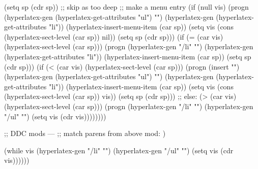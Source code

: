 \begin{ifhtml}
{              (setq sp (cdr sp)) ;; skip as too deep                     
              ;; make a menu entry
              (if (null vis)
                  (progn
                    (hyperlatex-gen (hyperlatex-get-attributes "ul") "\n")
                    (hyperlatex-gen (hyperlatex-get-attributes "li"))
                    (hyperlatex-insert-menu-item (car sp))
                    (setq vis (cons (hyperlatex-sect-level (car sp)) nil))
                    (setq sp (cdr sp)))
                  (if (= (car vis) (hyperlatex-sect-level (car sp)))
                      (progn
                        (hyperlatex-gen "/li" "\n")
                        (hyperlatex-gen (hyperlatex-get-attributes "li"))
                        (hyperlatex-insert-menu-item (car sp))
                        (setq sp (cdr sp)))
                      (if (< (car vis) (hyperlatex-sect-level (car sp)))
                          (progn
                            (insert "\n")
                            (hyperlatex-gen (hyperlatex-get-attributes "ul") "\n")
                            (hyperlatex-gen (hyperlatex-get-attributes "li"))
                            (hyperlatex-insert-menu-item (car sp))
                            (setq vis (cons (hyperlatex-sect-level (car sp)) vis))
                            (setq sp (cdr sp)))
                          ;; else: (> (car vis) (hyperlatex-sect-level (car sp)))
                          (progn
                            (hyperlatex-gen "/li" "\n")
                            (hyperlatex-gen "/ul" "\n")
                            (setq vis (cdr vis))))))))
        
        ;; DDC mods ---
        ;; match parens from above mod:
        )
      
      (while vis
        (hyperlatex-gen "/li" "\n")
        (hyperlatex-gen "/ul" "\n")
        (setq vis (cdr vis))))))
}
\T\end{ifhtml}


